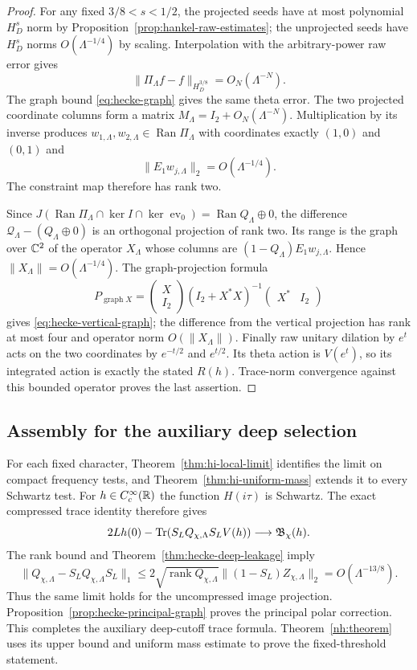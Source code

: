 \begin{proof}
For any fixed $3/8<s<1/2$, the projected seeds have at most polynomial
$H_D^s$ norm by Proposition~\ref{prop:hankel-raw-estimates}; the
unprojected seeds have $H_D^s$ norms $O(\Lambda^{-1/4})$ by scaling.
Interpolation with the arbitrary-power raw error gives
\[
 \|\Pi_\Lambda f-f\|_{H_D^{3/8}}=O_N(\Lambda^{-N}).
\]
The graph bound \eqref{eq:hecke-graph} gives the same theta error.
The two projected coordinate columns form a matrix
$M_\Lambda=I_2+O_N(\Lambda^{-N})$. Multiplication by its inverse
produces $w_{1,\Lambda},w_{2,\Lambda}\in\operatorname{Ran}\Pi_\Lambda$
with coordinates exactly $(1,0)$ and $(0,1)$ and
\[
                  \|E_1w_{j,\Lambda}\|_2=O(\Lambda^{-1/4}).
\]
The constraint map therefore has rank two.

Since $J(\operatorname{Ran}\Pi_\Lambda\cap\ker I\cap\ker\operatorname{ev}_0)
=\operatorname{Ran}Q_\Lambda\oplus0$, the difference
$\mathcal Q_\Lambda-(Q_\Lambda\oplus0)$ is an orthogonal projection
of rank two. Its range is the graph over $\mathbb C^2$ of the operator
$X_\Lambda$ whose columns are $(1-Q_\Lambda)E_1w_{j,\Lambda}$.
Hence $\|X_\Lambda\|=O(\Lambda^{-1/4})$. The graph-projection
formula
\[
 P_{\operatorname{graph}X}=
 \begin{pmatrix}X\\I_2\end{pmatrix}
 (I_2+X^*X)^{-1}
 \begin{pmatrix}X^*&I_2\end{pmatrix}
\]
gives \eqref{eq:hecke-vertical-graph}; the difference from the vertical
projection has rank at most four and operator norm $O(\|X_\Lambda\|)$.
Finally raw unitary dilation by $e^t$ acts on the two coordinates by
$e^{-t/2}$ and $e^{t/2}$. Its theta action is $V(e^t)$, so its
integrated action is exactly the stated $R(h)$. Trace-norm convergence
against this bounded operator proves the last assertion.
\end{proof}

\subsection{Assembly for the auxiliary deep selection}
For each fixed character, Theorem~\ref{thm:hi-local-limit} identifies
the limit on compact frequency tests, and
Theorem~\ref{thm:hi-uniform-mass} extends it to every Schwartz test.
For $h\in C_c^\infty(\mathbb R)$ the function $H(i\tau)$ is Schwartz.
The exact compressed trace identity therefore gives
\[
 2Lh(0)-\operatorname{Tr}(S_LQ_{\chi,\Lambda}S_LV(h))
                   \longrightarrow\mathfrak B_\chi(h).
\]
The rank bound and Theorem~\ref{thm:hecke-deep-leakage} imply
\[
 \|Q_{\chi,\Lambda}-S_LQ_{\chi,\Lambda}S_L\|_1
 \leq2\sqrt{\operatorname{rank}Q_{\chi,\Lambda}}
              \|(1-S_L)Z_{\chi,\Lambda}\|_2
                         =O(\Lambda^{-13/8}).
\]
Thus the same limit holds for the uncompressed image projection.
Proposition~\ref{prop:hecke-principal-graph} proves the principal
polar correction. This completes the auxiliary deep-cutoff trace
formula. Theorem~\ref{nh:theorem} uses its upper bound and uniform
mass estimate to prove the fixed-threshold statement.

